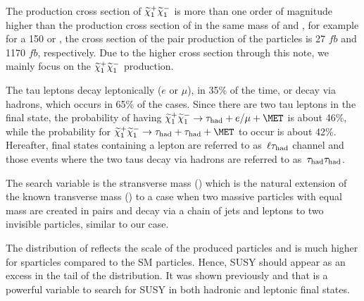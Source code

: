 The production cross section of $\widetilde{\chi}_{1}^{+}\widetilde{\chi}_{1}^{-}$ is more than one order of magnitude higher than the
production cross section of \sTau\sTau in the same mass of \sTau and \PSGcpDo,  
for example for a 150 \GeVcc \sTau or \PSGcpDo, the cross section 
of the pair production of the particles is 27 $fb$ and 1170 $fb$, respectively. Due to the higher cross section through this note, 
we mainly focus on the $\widetilde{\chi}_{1}^{+}\widetilde{\chi}_{1}^{-}$ production. 

The tau leptons decay leptonically ($e$ or $\mu$), in 35\% of the time, or decay via hadrons, which occurs in 65\% of the cases. Since there are two tau leptons in the final state, the probability of having $\PSGcpDo\PSGcmDo \rightarrow \hadtau+e/\mu+\MET$ is about 46\%, while the probability for $\PSGcpDo\PSGcmDo \rightarrow \hadtau+\hadtau+\MET$ to occur is about 42\%. Hereafter, final states containing a lepton are referred to as $\,\ell\tau_{\rm had}$ channel and those events where the two taus decay via hadrons are referred to as $\,\tau_{\rm had}\tau_{\rm had}$. 

The search variable is the stransverse mass (\mttwo) which is the natural extension of the known transverse mass (\mt) to a case 
when two massive particles with equal mass are created in pairs and decay via a chain of jets and leptons to two 
invisible particles, similar to our case.

The distribution of \mttwo reflects the scale of the produced particles and is much higher for sparticles
compared to the SM particles. Hence, SUSY should appear as an excess in the tail of the \mttwo distribution.
It was shown previously \cite{Chatrchyan:2012jx} and \cite{Khachatryan:2014qwa} that \mttwo is a powerful variable to search for SUSY in both
hadronic and leptonic final states.

